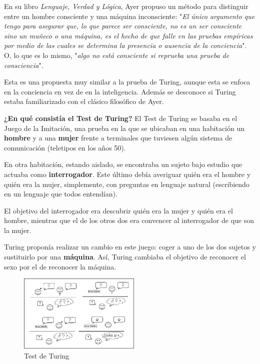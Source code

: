 \documentclass[a4paper, 11pt]{article} %
\begin{document}
\begin{itemize}
    En su libro \textit{Lenguaje, Verdad y Lógica}, Ayer propuso un método para distinguir entre un hombre consciente y una máquina inconsciente: "\textit{El único argumento que tengo para asegurar que, lo que parece ser consciente, no es un ser consciente sino un muñeco o una máquina, es el hecho de que falle en las pruebas empíricas por medio de las cuales se determina la presencia o ausencia de la conciencia}". O, lo que es lo mismo, "\textit{algo no está consciente si reprueba una prueba de consciencia}".

    Esta es una propuesta muy similar a la prueba de Turing, aunque esta se enfoca en la conciencia en vez de en la inteligencia. Además se desconoce si Turing estaba familiarizado con el clásico filosófico de Ayer.\\
\end{itemize}

\textbf{¿En qué consistía el Test de Turing?} El Test de Turing se basaba en el Juego de la Imitación, una prueba en la que se ubicaban en una habitación un \textbf{hombre} y a una \textbf{mujer} frente a terminales que tuviesen algún sistema de comunicación (teletipos en los años 50).

En otra habitación, estando aislado, se encontraba un sujeto bajo estudio que actuaba como \textbf{interrogador}. Este último debía averiguar quién era el hombre y quién era la mujer, simplemente, con preguntas en lenguaje natural (escribiendo en un lenguaje que todos entendían).

El objetivo del interrogador era descubrir quién era la mujer y quién era el hombre, mientras que el de los otros dos era convencer al interrogador de que son la mujer.

Turing proponía realizar un cambio en este juego: coger a uno de los dos sujetos y sustituirlo por una \textbf{máquina}. Así, Turing cambiaba el objetivo de reconocer el sexo por el de reconocer la máquina.

\begin{figure}[H]
\centering
\includegraphics[width=0.52\textwidth]{testdeturing.PNG}
\caption{Test de Turing}
\label{Test de Turing}
\end{figure}
\end{document}
